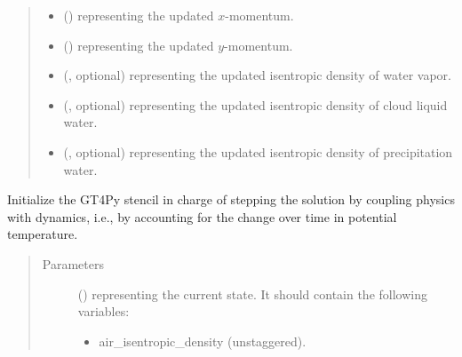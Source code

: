 \documentclass[letterpaper,10pt,english]{sphinxmanual}
\begin{document}
\begin{fulllineitems}
\begin{fulllineitems}
\begin{quote}
\begin{description}
\begin{itemize}
\item {} 
 () \textendash{}  representing the updated \(x\)-momentum.

\item {} 
 () \textendash{}  representing the updated \(y\)-momentum.

\item {} 
 (, optional) \textendash{}  representing the updated isentropic density of water vapor.

\item {} 
 (, optional) \textendash{}  representing the updated isentropic density of cloud liquid water.

\item {} 
 (, optional) \textendash{}  representing the updated isentropic density of precipitation water.

\end{itemize}


\end{description}\end{quote}

\end{fulllineitems}


\begin{fulllineitems}
\label{\detokenize{api:tasmania.dycore.prognostic_isentropic.PrognosticIsentropic._stencil_stepping_by_coupling_physics_with_dynamics_initialize}}
Initialize the GT4Py stencil in charge of stepping the solution by coupling physics with dynamics,
i.e., by accounting for the change over time in potential temperature.
\begin{quote}\begin{description}
\item[{Parameters}] \leavevmode
{} () \textendash{} 
{\hyperref[\detokenize{api:tasmania.storages.state_isentropic.StateIsentropic}]{}} representing the current state.
It should contain the following variables:
\begin{itemize}
\item {} 
air\_isentropic\_density (unstaggered).


\end{itemize}
\end{description}
\end{quote}
\end{fulllineitems}
\end{fulllineitems}
\end{document}
